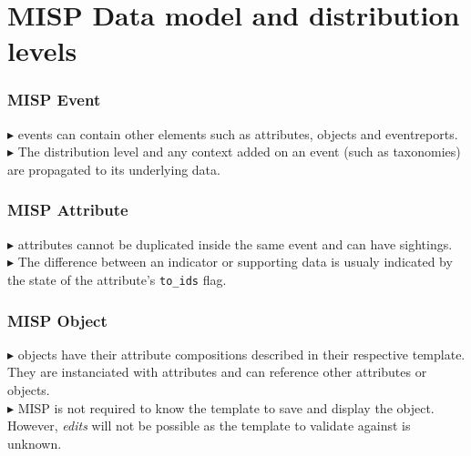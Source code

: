 \section{MISP Data model and distribution levels}
\begin{frame}
    \frametitle{MISP Event}

        {
            $\blacktriangleright$ events can contain other elements such as attributes, objects and eventreports.\\
            $\blacktriangleright$ The distribution level and any context added on an event (such as taxonomies) are propagated to its underlying data.
        }
\end{frame}

\begin{frame}
    \frametitle{MISP Attribute}

        {
            $\blacktriangleright$ attributes cannot be duplicated inside the same event and can have sightings.\\
            $\blacktriangleright$ The difference between an indicator or supporting data is usualy indicated by the state of the attribute's \texttt{to\_ids} flag.
        }
\end{frame}

\begin{frame}
    \frametitle{MISP Object}

        {
            $\blacktriangleright$ objects have their attribute compositions described in their respective template. They are instanciated with attributes and can reference other attributes or objects.\\
            $\blacktriangleright$ MISP is not required to know the template to save and display the object. However, \textit{edits} will not be possible as the template to validate against is unknown.
        }

\end{frame}

